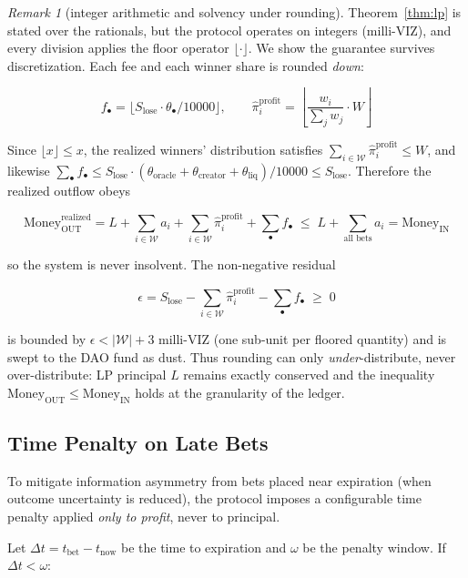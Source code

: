 \documentclass{ledger}
\theoremstyle{plain}
\theoremstyle{remark}
\newtheorem*{remark}{Remark}
\begin{document}
\begin{remark}[integer arithmetic and solvency under rounding]
Theorem~\ref{thm:lp} is stated over the rationals, but the protocol operates on
integers (milli-VIZ), and every division applies the floor operator
$\lfloor \cdot \rfloor$. We show the guarantee survives discretization. Each fee
and each winner share is rounded \emph{down}:

\[
f_\bullet = \lfloor S_{\text{lose}} \cdot \theta_\bullet / 10000 \rfloor, \qquad
\hat{\pi}_i^{\text{profit}} = \left\lfloor \frac{w_i}{\sum_{j} w_j} \cdot W
\right\rfloor
\]

Since $\lfloor x \rfloor \leq x$, the realized winners' distribution satisfies
$\sum_{i \in \mathcal{W}} \hat{\pi}_i^{\text{profit}} \leq W$, and likewise
$\sum_\bullet f_\bullet \leq S_{\text{lose}} \cdot (\theta_{\text{oracle}} +
\theta_{\text{creator}} + \theta_{\text{liq}})/10000 \leq S_{\text{lose}}$.
Therefore the realized outflow obeys

\[
\text{Money}_{\text{OUT}}^{\text{realized}} = L + \sum_{i \in \mathcal{W}} a_i +
\sum_{i \in \mathcal{W}} \hat{\pi}_i^{\text{profit}} + \sum_\bullet f_\bullet
\;\leq\; L + \sum_{\text{all bets}} a_i = \text{Money}_{\text{IN}}
\]

so the system is never insolvent. The non-negative residual

\[
\epsilon = S_{\text{lose}} - \sum_{i \in \mathcal{W}}
\hat{\pi}_i^{\text{profit}} - \sum_\bullet f_\bullet \;\geq\; 0
\]

is bounded by $\epsilon < |\mathcal{W}| + 3$ milli-VIZ (one sub-unit per floored
quantity) and is swept to the DAO fund as dust. Thus rounding can only
\emph{under}-distribute, never over-distribute: LP principal $L$ remains exactly
conserved and the inequality $\text{Money}_{\text{OUT}} \leq
\text{Money}_{\text{IN}}$ holds at the granularity of the ledger.
\end{remark}

\subsection{Time Penalty on Late Bets}\label{sec:timepenalty}

To mitigate information asymmetry from bets placed near expiration (when outcome
uncertainty is reduced), the protocol imposes a configurable time penalty
applied \emph{only to profit}, never to principal.

Let $\Delta t = t_{\text{bet}} - t_{\text{now}}$ be the time to expiration and
$\omega$ be the penalty window. If $\Delta t < \omega$:
\end{document}
